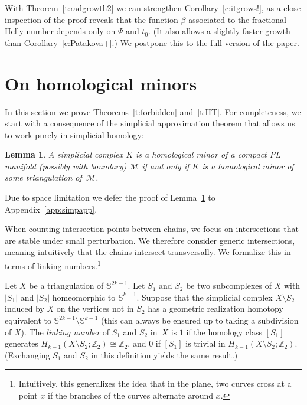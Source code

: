 \documentclass[a4paper,UKenglish,thm-restate]{article}
\newcommand{\Z}{\mathbb{Z}}
\newcommand{\s}{\mathbb{S}}
\newcommand{\M}{\mathcal{M}}
\newcommand{\defn}[1]{\emph{\color{violet}#1}}
\newtheorem{lemma}{Lemma}[section]
\begin{document}
\noindent
With Theorem~\ref{t:radgrowth2} we can strengthen Corollary~\ref{c:itgrows!}, as a close inspection of the proof reveals that the function $\beta$ associated to the fractional Helly number depends only on $\Psi$ and $t_0$. (It also allows a slightly faster growth than Corollary~\ref{c:Patakova+}.) We postpone this to the full version of the paper.


\section{On homological minors}\label{s:toolbox}\label{s:back}

In this section we prove Theorems~\ref{t:forbidden} and~\ref{t:HT}. For completeness, we start with a consequence of the simplicial approximation theorem that allows us to work purely in simplicial homology:

\begin{lemma}\label{l:going-generic-simplicial}
  A simplicial complex $K$ is a homological minor of a compact PL manifold (possibly with boundary) $\M$ if and only if $K$ is a homological minor of some triangulation of~$\M$.
\end{lemma}

\noindent
Due to space limitation we defer the proof of Lemma~\ref{l:going-generic-simplicial} to Appendix~\ref{app:simpapp}.

\medskip

When counting intersection points between chains, we focus on intersections that are stable under small perturbation. We therefore consider generic intersections, meaning intuitively that the chains intersect transversally. We formalize this in terms of linking numbers.\footnote{Intuitively, this generalizes the idea that in the plane, two curves cross at a point $x$ if the branches of the curves alternate around $x$.}

\medskip

Let $X$ be a triangulation of $\s^{2k-1}$. Let $S_1$ and $S_2$ be two subcomplexes of $X$ with $|S_1|$ and $|S_2|$ homeomorphic to $\s^{k-1}$. Suppose that the simplicial complex $X \setminus S_2$ induced by $X$ on the vertices not in $S_2$ has a geometric realization homotopy equivalent to $\s^{2k-1}\setminus \s^{k-1}$ (this can always be ensured up to taking a subdivision of $X$). The \defn{linking number} of $S_1$ and $S_2$ in~$X$ is $1$ if the homology class $[S_1]$ generates $H_{k-1}(X\setminus S_2;\Z_2)\cong\Z_2$, and $0$ if $[S_1]$ is trivial in $H_{k-1}(X\setminus S_2;\Z_2)$. (Exchanging $S_1$ and $S_2$ in this definition yields the same result.)
\end{document}
